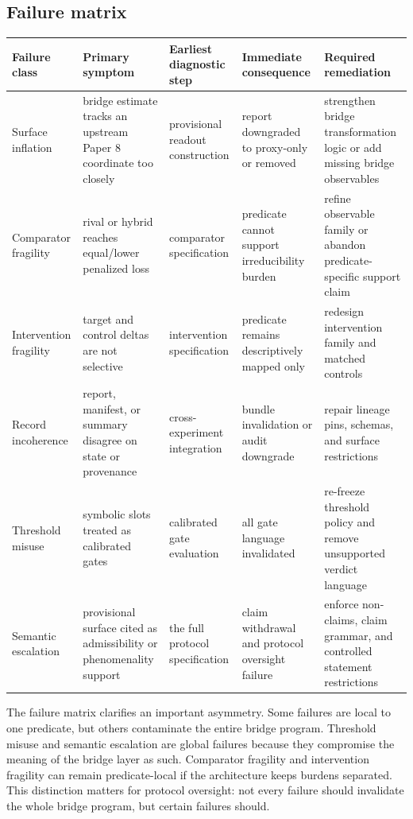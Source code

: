 \documentclass[11pt,a4paper]{article}
\theoremstyle{definition}
\begin{document}
\subsection{Failure matrix}
\begin{center}
\small
\begin{tabularx}{\linewidth}{@{}>{\raggedright\arraybackslash}p{}>{\raggedright\arraybackslash}p{}>{\raggedright\arraybackslash}p{}>{\raggedright\arraybackslash}p{}>{\raggedright\arraybackslash}p{}@{}}
\toprule
Failure class & Primary symptom & Earliest diagnostic step & Immediate consequence & Required remediation \\
\midrule
Surface inflation & bridge estimate tracks an upstream Paper 8 coordinate too closely & provisional readout construction & report downgraded to proxy-only or removed & strengthen bridge transformation logic or add missing bridge observables \\
Comparator fragility & rival or hybrid reaches equal/lower penalized loss & comparator specification & predicate cannot support irreducibility burden & refine observable family or abandon predicate-specific support claim \\
Intervention fragility & target and control deltas are not selective & intervention specification & predicate remains descriptively mapped only & redesign intervention family and matched controls \\
Record incoherence & report, manifest, or summary disagree on state or provenance & cross-experiment integration & bundle invalidation or audit downgrade & repair lineage pins, schemas, and surface restrictions \\
Threshold misuse & symbolic slots treated as calibrated gates & calibrated gate evaluation & all gate language invalidated & re-freeze threshold policy and remove unsupported verdict language \\
Semantic escalation & provisional surface cited as admissibility or phenomenality support & the full protocol specification & claim withdrawal and protocol oversight failure & enforce non-claims, claim grammar, and controlled statement restrictions \\
\bottomrule
\end{tabularx}
\end{center}

The failure matrix clarifies an important asymmetry. Some failures are local to one predicate, but others contaminate the entire bridge program. Threshold misuse and semantic escalation are global failures because they compromise the meaning of the bridge layer as such. Comparator fragility and intervention fragility can remain predicate-local if the architecture keeps burdens separated. This distinction matters for protocol oversight: not every failure should invalidate the whole bridge program, but certain failures should.
\end{document}

